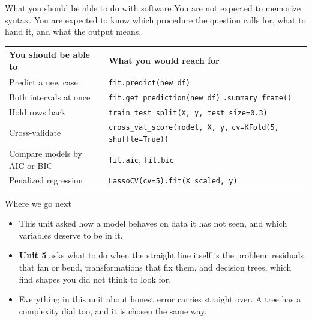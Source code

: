 \documentclass[aspectratio=169]{beamer}
\begin{document}
\begin{frame}{What you should be able to do with software}
\small
You are not expected to memorize syntax. You are expected to know which procedure the question
calls for, what to hand it, and what the output means.
\begin{center}\footnotesize
\begin{tabular}{p{} p{}}
\toprule
\textbf{You should be able to} & \textbf{What you would reach for} \\
\midrule
Predict a new case & \texttt{fit.predict(new\_df)} \\
Both intervals at once & \texttt{fit.get\_prediction(new\_df)} \newline
\texttt{\phantom{xx}.summary\_frame()} \\
Hold rows back & \texttt{train\_test\_split(X, y, test\_size=0.3)} \\
Cross-validate & \texttt{cross\_val\_score(model, X, y,} \newline
\texttt{\phantom{xx}cv=KFold(5, shuffle=True))} \\
Compare models by AIC or BIC & \texttt{fit.aic}, \texttt{fit.bic} \\
Penalized regression & \texttt{LassoCV(cv=5).fit(X\_scaled, y)} \\
\bottomrule
\end{tabular}
\end{center}
\end{frame}

\begin{frame}{Where we go next}
\begin{itemize}
  \item This unit asked how a model behaves on data it has not seen, and which variables
        deserve to be in it.
  \item \textbf{Unit 5} asks what to do when the straight line itself is the problem: residuals
        that fan or bend, transformations that fix them, and decision trees, which find shapes
        you did not think to look for.
  \item Everything in this unit about honest error carries straight over. A tree has a
        complexity dial too, and it is chosen the same way.
\end{itemize}
\end{frame}
\end{document}
